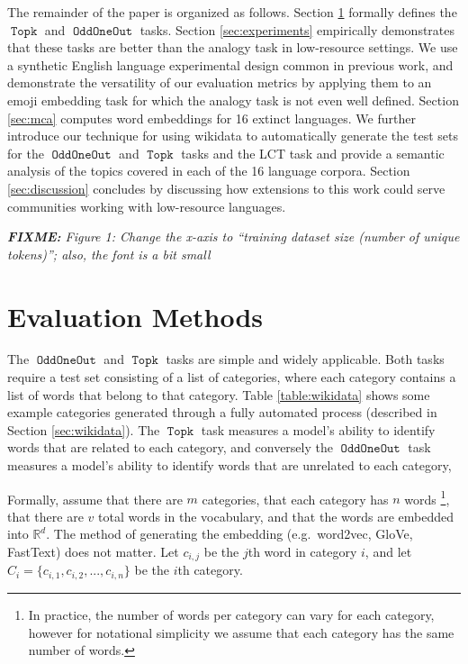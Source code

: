 \documentclass[11pt,a4paper]{article}
\DeclareMathOperator{\OddOneOut}{\texttt{OddOneOut}}
\DeclareMathOperator{\topk}{\texttt{Topk}}
\newcommand{\fixme}[1]{{\color{red}\itshape \textbf{FIXME:} {#1}}}
\begin{document}
The remainder of the paper is organized as follows.
Section \ref{sec:method} formally defines the $\topk$ and $\OddOneOut$ tasks.
Section \ref{sec:experiments} empirically demonstrates that these tasks are better than the analogy task in low-resource settings.
We use a synthetic English language experimental design common in previous work,
and demonstrate the versatility of our evaluation metrics by applying them to an emoji embedding task for which the analogy task is not even well defined.
Section \ref{sec:mca} computes word embeddings for 16 extinct languages.
We further introduce our technique for using wikidata to automatically generate the test sets for the $\OddOneOut$ and $\topk$ tasks and the LCT task and provide a semantic analysis of the topics covered in each of the 16 language corpora.
Section \ref{sec:discussion} concludes by discussing how extensions to this work could serve communities working with low-resource languages.

\fixme{Figure 1: Change the x-axis to ``training dataset size (number of unique tokens)''; also, the font is a bit small}

\section{Evaluation Methods}
\label{sec:method}
The $\OddOneOut$ and $\topk$ tasks are simple and widely applicable.
Both tasks require a test set consisting of a list of categories,
where each category contains a list of words that belong to that category.
Table \ref{table:wikidata} shows some example categories generated through a fully automated process (described in Section \ref{sec:wikidata}).
The $\topk$ task measures a model's ability to identify words that are related to each category,
and conversely the $\OddOneOut$ task measures a model's ability to identify words that are unrelated to each category,

Formally,
assume that there are $m$ categories,
that each category has $n$ words%
\footnote{
    In practice, the number of words per category can vary for each category,
    however for notational simplicity we assume that each category has the same number of words.
},
that there are $v$ total words in the vocabulary,
and that the words are embedded into $\mathbb {R}^d$.
The method of generating the embedding (e.g.\ word2vec, GloVe, FastText) does not matter.
Let $c_{i,j}$ be the $j$th word in category $i$,
and let $C_i = \{c_{i,1}, c_{i,2}, ..., c_{i,n}\}$ be the $i$th category.
\end{document}
